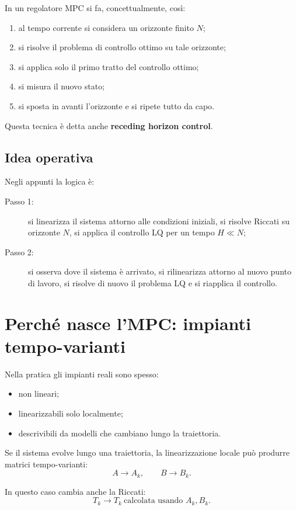 In un regolatore MPC si fa, concettualmente, così:
\begin{enumerate}
    \item al tempo corrente si considera un orizzonte finito \(N\);
    \item si risolve il problema di controllo ottimo su tale orizzonte;
    \item si applica solo il primo tratto del controllo ottimo;
    \item si misura il nuovo stato;
    \item si sposta in avanti l'orizzonte e si ripete tutto da capo.
\end{enumerate}

Questa tecnica è detta anche \textbf{receding horizon control}.

\subsection{Idea operativa}

Negli appunti la logica è:
\begin{description}
    \item[Passo 1:] si linearizza il sistema attorno alle condizioni iniziali, si risolve
    Riccati su orizzonte \(N\), si applica il controllo LQ per un tempo \(H\ll N\);
    \item[Passo 2:] si osserva dove il sistema è arrivato, si rilinearizza attorno al nuovo
    punto di lavoro, si risolve di nuovo il problema LQ e si riapplica il controllo.
\end{description}

\section{Perché nasce l'MPC: impianti tempo-varianti}

Nella pratica gli impianti reali sono spesso:
\begin{itemize}
    \item non lineari;
    \item linearizzabili solo localmente;
    \item descrivibili da modelli che cambiano lungo la traiettoria.
\end{itemize}

Se il sistema evolve lungo una traiettoria, la linearizzazione locale può produrre matrici
tempo-varianti:
\[
A \to A_k,
\qquad
B \to B_k.
\]

In questo caso cambia anche la Riccati:
\[
T_k \to T_k \ \text{calcolata usando } A_k,B_k.
\]

